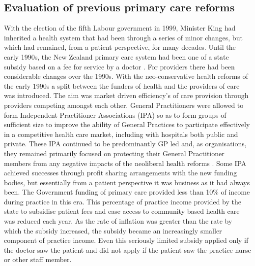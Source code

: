 \documentclass[11pt,a4paper]{article}
\begin{document}
\subsection{Evaluation of previous primary care reforms}
With the election of the fifth Labour government in 1999, Minister King had inherited a health system that had been through a series of minor changes, but which had remained, from a patient perspective, for many decades. Until the early 1990s, the New Zealand primary care system had been one of a state subsidy based on a fee for service by a doctor \citep{gauld2006new}. For providers there had been considerable changes over the 1990s. With the neo-conservative health reforms of the early 1990s a split between the funders of health and the providers of care was introduced. The aim was market driven efficiency's of care provision through providers competing amongst each other. General Practitioners were allowed to form Independent Practitioner Associations (IPA) so as to form groups of sufficient size to improve the ability of General Practices to participate effectively in a competitive health care market, including with hospitals both public and private. These IPA continued to be predominantly GP led and, as organisations, they remained primarily focused on protecting their General Practitioner members from any negative impacts of the neoliberal health reforms \citep{malcolm1999new}. Some IPA achieved successes through profit sharing arrangements with the new funding bodies, but essentially from a patient perspective it was business as it had always been. The Government funding of primary care provided less than 10\% of income during practice in this era. This percentage of practice income provided by the state to subsidise patient fees and ease access to community based health care was reduced each year. As the rate of inflation was greater than the rate by which the subsidy increased, the subsidy became an increasingly smaller component of practice income. Even this seriously limited subsidy applied only if the doctor saw the patient and did not apply if the patient saw the practice nurse or other staff member. \\    
\end{document}
